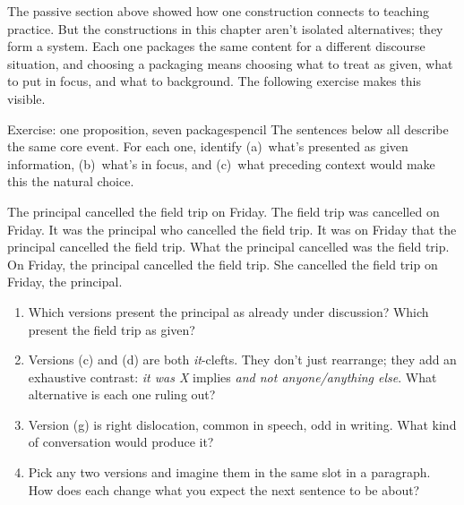\ea\label{ex:right-dis-discourse}
   \z
\z
{}

The passive section above showed how one construction connects to teaching practice. But the constructions in this chapter aren't isolated alternatives; they form a system. Each one packages the same content for a different discourse situation, and choosing a packaging means choosing what to treat as given, what to put in focus, and what to background. The following exercise makes this visible.

\begin{tblsframedsymbol}{Exercise: one proposition, seven packages}{pencil}
The sentences below all describe the same core event. For each one, identify (a)~what's presented as given information, (b)~what's in focus, and (c)~what preceding context would make this the natural choice.

\ea\label{ex:seven-packages}
   \ea The principal cancelled the field trip on Friday.
   \ex The field trip was cancelled on Friday.
   \ex It was the principal who cancelled the field trip.
   \ex It was on Friday that the principal cancelled the field trip.
   \ex What the principal cancelled was the field trip.
   \ex On Friday, the principal cancelled the field trip.
   \ex She cancelled the field trip on Friday, the principal.
   \z
\z

\begin{enumerate}[noitemsep, leftmargin=*]
\item Which versions present the principal as already under discussion? Which present the field trip as given?
\item Versions (c) and (d) are both \emph{it}-clefts. They don't just rearrange; they add an exhaustive contrast: \emph{it was X} implies \emph{and not anyone/anything else}. What alternative is each one ruling out?
\item Version (g) is right dislocation, common in speech, odd in writing. What kind of conversation would produce it?
\item Pick any two versions and imagine them in the same slot in a paragraph. How does each change what you expect the next sentence to be about?
\end{enumerate}
\end{tblsframedsymbol}

